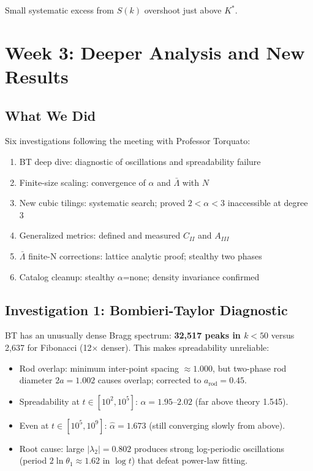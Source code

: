 \documentclass[11pt,letterpaper]{article}
\begin{document}
Small systematic excess from $S(k)$ overshoot just above $K^*$.

\section{Week 3: Deeper Analysis and New Results}

\subsection{What We Did}

Six investigations following the meeting with Professor Torquato:
\begin{enumerate}[leftmargin=2em]
  \item BT deep dive: diagnostic of oscillations and spreadability failure
  \item Finite-size scaling: convergence of $\alpha$ and $\bar\Lambda$ with $N$
  \item New cubic tilings: systematic search; proved $2<\alpha<3$ inaccessible at degree 3
  \item Generalized metrics: defined and measured $C_{II}$ and $A_{III}$
  \item $\bar\Lambda$ finite-N corrections: lattice analytic proof; stealthy two phases
  \item Catalog cleanup: stealthy $\alpha$=none; density invariance confirmed
\end{enumerate}

\subsection{Investigation 1: Bombieri-Taylor Diagnostic}

BT has an unusually dense Bragg spectrum: \textbf{32,517 peaks in $k<50$} versus 2,637 for Fibonacci
(12$\times$ denser). This makes spreadability unreliable:

\begin{itemize}[leftmargin=1.5em]
  \item Rod overlap: minimum inter-point spacing $\approx1.000$, but two-phase rod diameter
    $2a=1.002$ causes overlap; corrected to $a_\text{rod}=0.45$.
  \item Spreadability at $t\in[10^2,10^5]$: $\hat\alpha=1.95$–$2.02$ (far above theory 1.545).
  \item Even at $t\in[10^5,10^9]$: $\hat\alpha=1.673$ (still converging slowly from above).
  \item Root cause: large $|\lambda_2|=0.802$ produces strong log-periodic oscillations
    (period $2\ln\theta_1\approx1.62$ in $\log t$) that defeat power-law fitting.
\end{itemize}
\end{document}
